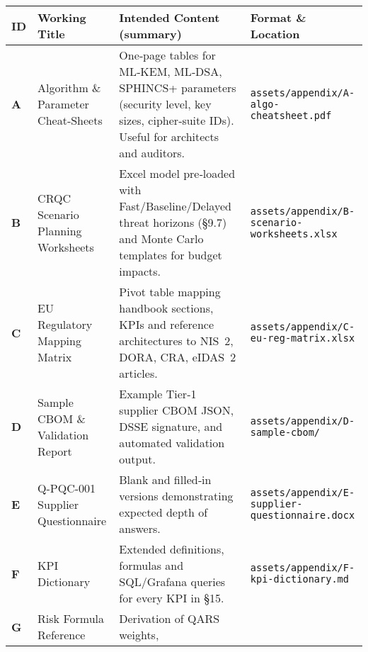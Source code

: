 \documentclass[
  english,
]{article}
\begin{document}
\begin{longtable}[]{@{}
  >{\raggedright\arraybackslash}p{}
  >{\raggedright\arraybackslash}p{}
  >{\raggedright\arraybackslash}p{}
  >{\raggedright\arraybackslash}p{}@{}}
\toprule\noalign{}
\begin{minipage}[b]{\linewidth}\raggedright
ID
\end{minipage} & \begin{minipage}[b]{\linewidth}\raggedright
Working Title
\end{minipage} & \begin{minipage}[b]{\linewidth}\raggedright
Intended Content (summary)
\end{minipage} & \begin{minipage}[b]{\linewidth}\raggedright
Format \& Location
\end{minipage} \\
\midrule\noalign{}
\endhead
\bottomrule\noalign{}
\endlastfoot
\textbf{A} & Algorithm \& Parameter Cheat‑Sheets & One‑page tables for
ML‑KEM, ML‑DSA, SPHINCS+ parameters (security level, key sizes,
cipher‑suite IDs). Useful for architects and auditors. &
\texttt{assets/appendix/A-algo-cheatsheet.pdf} \\
\textbf{B} & CRQC Scenario Planning Worksheets & Excel model pre‑loaded
with Fast/Baseline/Delayed threat horizons (§9.7) and Monte Carlo
templates for budget impacts. &
\texttt{assets/appendix/B-scenario-worksheets.xlsx} \\
\textbf{C} & EU Regulatory Mapping Matrix & Pivot table mapping handbook
sections, KPIs and reference architectures to NIS~2, DORA, CRA, eIDAS~2
articles. & \texttt{assets/appendix/C-eu-reg-matrix.xlsx} \\
\textbf{D} & Sample CBOM \& Validation Report & Example Tier‑1 supplier
CBOM JSON, DSSE signature, and automated validation output. &
\texttt{assets/appendix/D-sample-cbom/} \\
\textbf{E} & Q-PQC-001 Supplier Questionnaire & Blank and filled‑in
versions demonstrating expected depth of answers. &
\texttt{assets/appendix/E-supplier-questionnaire.docx} \\
\textbf{F} & KPI Dictionary & Extended definitions, formulas and
SQL/Grafana queries for every KPI in §15. &
\texttt{assets/appendix/F-kpi-dictionary.md} \\
\textbf{G} & Risk Formula Reference & Derivation of QARS weights,

\end{longtable}
\end{document}
